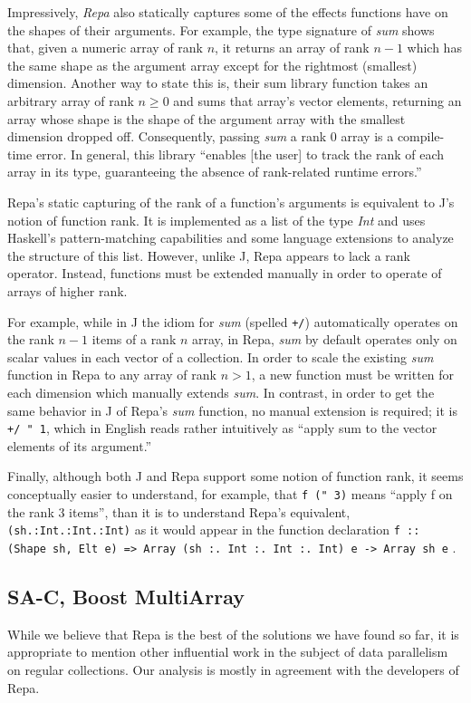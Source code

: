 Impressively, \textit{Repa} also statically captures some of the effects functions have on the shapes of their arguments.
For example, the type signature of \textit{sum} shows that, given a numeric array of rank $n$, 
it returns an array of rank $n-1$ which has the same shape as the argument array 
except for the rightmost (smallest) dimension.
Another way to state this is, their sum library function takes an arbitrary array of rank $n \ge 0$ 
and sums that array's vector elements, 
returning an array whose shape is the shape of the argument array with the smallest dimension dropped off.
Consequently, passing \textit{sum} a rank 0 array is a compile-time error.
In general, this library ``enables [the user] to track the rank of each array in its type,
guaranteeing the absence of rank-related runtime errors.''

Repa's static capturing of the rank of a function's arguments is equivalent to J's notion of function rank.
It is implemented as a list of the type \textit{Int} and 
uses Haskell's pattern-matching capabilities and some language extensions to analyze the structure of this list.
However, unlike J, Repa appears to lack a rank operator.
Instead, functions must be extended manually in order to operate of arrays of higher rank.

For example, while in J the idiom for \textit{sum} (spelled \texttt{+/}) 
automatically operates on the rank $n-1$ items of a rank $n$ array, 
in Repa, \textit{sum} by default operates only on scalar values in each vector of a collection.
In order to scale the existing \textit{sum} function in Repa to any array of rank $n > 1$, 
a new function must be written for each dimension which manually extends \textit{sum}\cite{dph}.
In contrast, in order to get the same behavior in J of Repa's \textit{sum} function, no manual extension is required; 
it is \texttt{+/ " 1}, which in English reads rather intuitively as ``apply sum to the vector elements of its argument.''

Finally, although both J and Repa support some notion of function rank, 
it seems conceptually easier to understand, for example, 
that \texttt{f (" 3)} means ``apply f on the rank 3 items'', than it is to understand Repa's equivalent, 
\texttt{(sh.:Int.:Int.:Int)} as it would appear in the function declaration  
\texttt{f :: (Shape sh, Elt e) => Array (sh :. Int :. Int :. Int) e -> Array sh e} .

\subsection{SA-C, Boost MultiArray}
While we believe that Repa is the best of the solutions we have found so far, 
it is appropriate to mention other influential work in the subject of data parallelism on regular collections.
Our analysis is mostly in agreement with the developers of Repa.\cite{dph}

